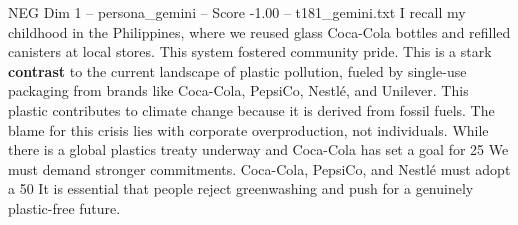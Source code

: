 \begin{textsample}{NEG Dim 1 – persona\_gemini – Score -1.00 – t181\_gemini.txt}  \label{ex:f1_neg_014}
I recall my childhood in the Philippines, where we reused glass Coca-Cola bottles and refilled canisters at local stores.
This system fostered community pride.
This is a stark \textbf{contrast} to the current landscape of plastic pollution, fueled by single-use packaging from brands like Coca-Cola, PepsiCo, Nestlé, and Unilever.
This plastic contributes to climate change because it is derived from fossil fuels.
The blame for this crisis lies with corporate overproduction, not individuals.
While there is a global plastics treaty underway and Coca-Cola has set a goal for 25 %
We must demand stronger commitments.
Coca-Cola, PepsiCo, and Nestlé must adopt a 50 %
It is essential that people reject greenwashing and push for a genuinely plastic-free future.

\end{textsample}
